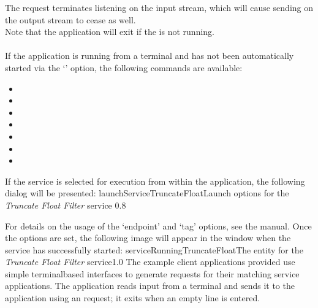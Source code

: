 The  request terminates listening
on the input stream, which will cause sending on the output stream to cease as well.\\

Note that the application will exit if the  is not
running.\\

\insertAppParameters
{}
\insertFilterServiceComment\\

If the application is running from a terminal and has not been automatically started via
the `' option, the following commands are available:
\begin{itemize}
\item{}
\item\exSp{}
\item\exSp{}
\item\exSp{}
\item\exSp{}
\item\exSp{}
\item\exSp{}
\end{itemize}
\condPage
If the service is selected for execution from within the \emph{\CMU} application, the
following dialog will be presented:
%
{launchServiceTruncateFloat}{Launch options for the \emph{Truncate Float Filter} service}%
{0.8}

For details on the usage of the `endpoint' and `tag' options, see the \emph{\CMU} manual.
Once the options are set, the following image will appear in the \emph{\CMU} window when
the service has successfully started:
%
{serviceRunningTruncateFloat}{The \emph{\CMU} entity for the \emph{Truncate Float Filter}
service}{1.0}
\secondaryEnd
\condPage
{}
The example client applications provided use simple terminal\longDash{}based interfaces to
generate requests for their matching service applications.
The  application reads input from a terminal and
sends it to the  application using an
 request; it exits when an empty line is
entered.\\

